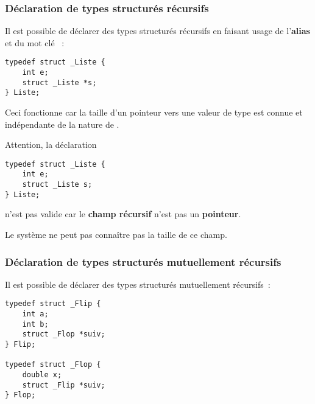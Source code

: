 \begin{frame}[fragile]
\frametitle{Déclaration de types structurés récursifs}
Il est possible de \alert{déclarer des types structurés récursifs} en
faisant usage de l'{\bf alias} et du mot clé ~:
\medskip

\begin{lstlisting}
typedef struct _Liste {
    int e;
    struct _Liste *s;
} Liste;
\end{lstlisting}
\medskip

Ceci fonctionne car la taille d'un pointeur vers une valeur de type
 est connue et indépendante de la nature de .
\bigskip

Attention, la déclaration
\begin{lstlisting}
typedef struct _Liste {
    int e;
    struct _Liste s;
} Liste;
\end{lstlisting}
n'est pas valide car le {\bf champ récursif} n'est pas un {\bf pointeur}.
\medskip

Le système ne peut pas connaître pas la taille de ce champ.
\end{frame}

\begin{frame}[fragile]
\frametitle{Déclaration de types structurés mutuellement récursifs}
Il est possible de \alert{déclarer des types structurés mutuellement récursifs}~:
\begin{lstlisting}
typedef struct _Flip {
    int a;
    int b;
    struct _Flop *suiv;
} Flip;

typedef struct _Flop {
    double x;
    struct _Flip *suiv;
} Flop;
\end{lstlisting}

\begin{center}
\end{center}
\end{frame}

